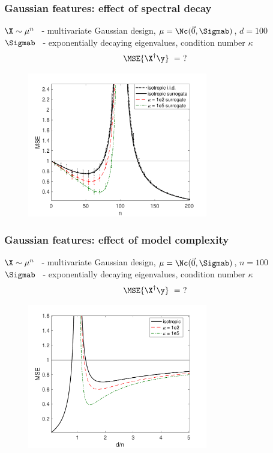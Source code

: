 \begin{subframe}
  \frametitle{Gaussian features: effect of spectral decay}
  $\X\sim\mu^n$ \ - multivariate Gaussian design,
  $\mu=\Nc(\vec{0},\Sigmab)$, $d=100$\\
$\Sigmab$ \ - exponentially decaying eigenvalues, condition
number $\kappa$
\pause
\begin{align*}
\MSE{\X^\dagger\y}\ =\ ?
  \end{align*}
  \pause \vspace{-3mm}
  \begin{figure}
      \centering
      \includegraphics[width=0.7\textwidth]{Figures/descent/descent-full}
  \end{figure}
\end{subframe}

\begin{subframe}
  \frametitle{Gaussian features: effect of model complexity}
    $\X\sim\mu^n$ \ - multivariate Gaussian design,
  $\mu=\Nc(\vec{0},\Sigmab)$, $n=100$\\
$\Sigmab$ \ - exponentially decaying eigenvalues, condition
number $\kappa$
\begin{align*}
\MSE{\X^\dagger\y}\ =\ ?
  \end{align*}\vspace{-3mm}
  \begin{figure}
      \centering
    \includegraphics[width=0.7\textwidth]{Figures/descent/descent-model}
  \end{figure}
\end{subframe}

